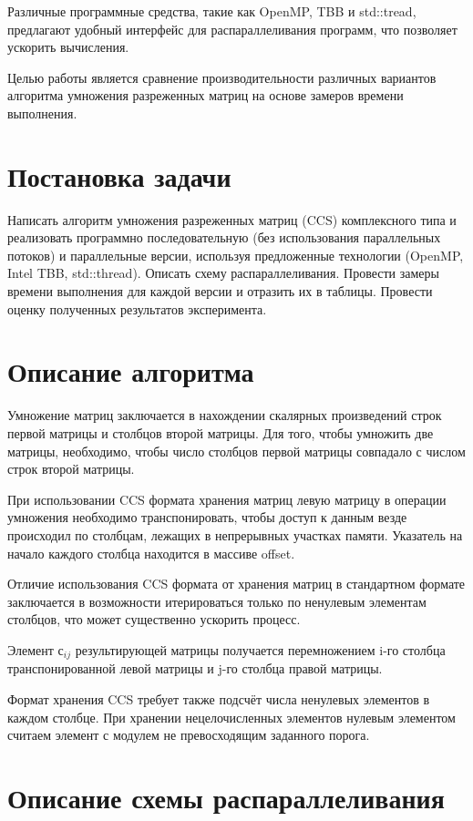 \documentclass[12pt]{article}
\begin{document}
Различные программные средства, такие как OpenMP, TBB и std::tread, предлагают удобный интерфейс для распараллеливания программ, что позволяет ускорить вычисления.

Целью работы является сравнение производительности различных вариантов алгоритма умножения разреженных матриц на основе замеров времени выполнения.

\section*{Постановка задачи}

Написать алгоритм умножения разреженных матриц (CCS) комплексного типа и реализовать программно последовательную (без использования параллельных потоков) и параллельные версии, используя предложенные технологии (OpenMP, Intel TBB, std::thread). Описать схему распараллеливания. Провести замеры времени выполнения для каждой версии и отразить их в таблицы. Провести оценку полученных результатов эксперимента.

\section*{Описание алгоритма}

Умножение матриц заключается в нахождении скалярных произведений строк первой матрицы и столбцов второй матрицы. Для того, чтобы умножить две матрицы, необходимо, чтобы число столбцов первой матрицы совпадало с числом строк второй матрицы.

При использовании CCS формата хранения матриц левую матрицу в операции умножения необходимо транспонировать, чтобы доступ к данным везде происходил по столбцам, лежащих в непрерывных участках памяти. Указатель на начало каждого столбца находится в массиве offset.

Отличие использования CCS формата от хранения матриц в стандартном формате заключается в возможности итерироваться только по ненулевым элементам столбцов, что может существенно ускорить процесс.

Элемент с$_{ij}$ результирующей матрицы получается перемножением i-го столбца транспонированной левой матрицы и j-го столбца правой матрицы.

Формат хранения CCS требует также подсчёт числа ненулевых элементов в каждом столбце. При хранении нецелочисленных элементов нулевым элементом считаем элемент с модулем не превосходящим заданного порога.

\section*{Описание схемы распараллеливания}
\end{document}
